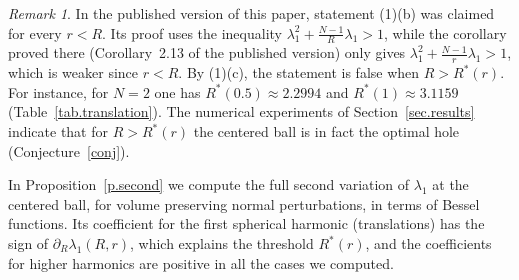 \documentclass[11pt]{amsart}
\theoremstyle{remark}
\newtheorem{remark}[lemma]{Remark}
\numberwithin{equation}{section}
\begin{document}
\begin{remark}
In the published version of this paper, statement (1)(b) was claimed for every $r<R$. Its proof uses the inequality $\lambda_1^2+\frac{N-1}{R}\lambda_1>1$, while the corollary proved there (Corollary~2.13 of the published version) only gives $\lambda_1^2+\frac{N-1}{r}\lambda_1>1$, which is weaker since $r<R$. By (1)(c), the statement is false when $R>R^*(r)$. For instance, for $N=2$ one has $R^*(0.5)\approx2.2994$ and $R^*(1)\approx3.1159$ (Table~\ref{tab.translation}). The numerical experiments of Section~\ref{sec.results} indicate that for $R>R^*(r)$ the centered ball is in fact the optimal hole (Conjecture~\ref{conj}).
\end{remark}

In Proposition~\ref{p.second} we compute the full second variation of $\lambda_1$ at the centered ball, for volume preserving normal perturbations, in terms of Bessel functions. Its coefficient for the first spherical harmonic (translations) has the sign of $\partial_R\lambda_1(R,r)$, which explains the threshold $R^*(r)$, and the coefficients for higher harmonics are positive in all the cases we computed.
\end{document}
